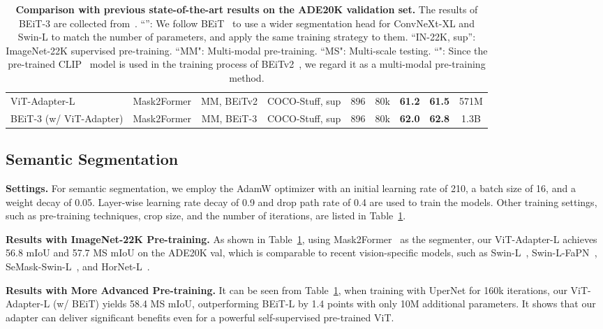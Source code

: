 \documentclass{article} \usepackage{iclr2023_conference,times}
\begin{document}
\begin{table}[t]
\begin{tabular}{l|c|c|c|c|c|cc|c}
	    \rowcolor{yellow!15} 
	    ViT-Adapter-L & Mask2Former &MM, BEiTv2 & COCO-Stuff, sup & 896 & 80k & \textbf{61.2} & \textbf{61.5} & 571M\\
	    \rowcolor{yellow!15} 
	    BEiT-3 (w/ ViT-Adapter) & Mask2Former & MM, BEiT-3 & COCO-Stuff, sup & 896 & 80k  & \textbf{62.0} & \textbf{62.8} & 1.3B\\
	    \bottomrule
    \end{tabular}
    \caption{\textbf{Comparison with previous state-of-the-art results on the ADE20K validation set.} 
	The results of BEiT-3 are collected from~\citep{wang2022beit3}.
	``'': We follow BEiT~\citep{bao2021beit} to use a wider segmentation head for ConvNeXt-XL and Swin-L to match the number of parameters, and apply the same training strategy to them.
    ``IN-22K, sup'': ImageNet-22K supervised pre-training.
    ``MM": Multi-modal pre-training.
    ``MS": Multi-scale testing.
    ``": Since the pre-trained CLIP~\citep{radford2021learning} model is used in the training process of BEiTv2~\citep{peng2022beitv2}, we regard it as a multi-modal pre-training method.
    }
    \label{tab:sota_ade}
\end{table} 

\subsection{Semantic Segmentation}
\label{sec:appendix_segmentation}

\noindent\textbf{Settings.} For semantic segmentation, we employ the AdamW optimizer with an initial learning rate of 210, a batch size of 16, and a weight decay of 0.05. 
Layer-wise learning rate decay of 0.9 and drop path rate of 0.4 are used to train the models. 
Other training settings, such as pre-training techniques, crop size, and the number of iterations, are listed in Table~\ref{tab:sota_ade}.



\noindent \textbf{Results with ImageNet-22K Pre-training.}
As shown in Table~\ref{tab:sota_ade}, 
using Mask2Former~\citep{cheng2021masked} as the segmenter,
our ViT-Adapter-L achieves 56.8 mIoU and 57.7 MS mIoU on the ADE20K val, which is comparable to recent vision-specific models, such as Swin-L~\citep{liu2021swin}, Swin-L-FaPN~\citep{huang2021fapn}, SeMask-Swin-L~\citep{jain2021semask}, and HorNet-L~\citep{rao2022hornet}.

\noindent \textbf{Results with More Advanced Pre-training.}
It can be seen from Table~\ref{tab:sota_ade}, when training with UperNet for 160k iterations, our ViT-Adapter-L (w/ BEiT) yields 58.4 MS mIoU, outperforming BEiT-L by 1.4 points with only 10M additional parameters.
It shows that our adapter can deliver significant benefits even for a powerful self-supervised pre-trained ViT.
\end{document}
